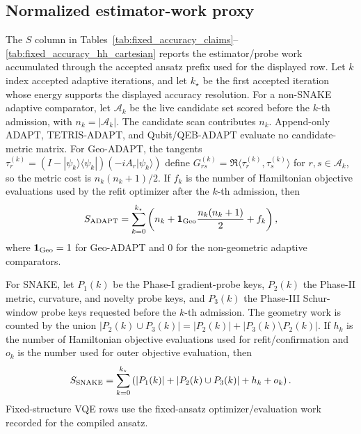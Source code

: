 \documentclass[
  reprint,
  amsmath,
  amssymb,
  aps,
  pra,
  nofootinbib,
  superscriptaddress,
  floatfix
]{revtex4-2}
\begin{document}
\subsection{Normalized estimator-work proxy}

The \(S\) column in Tables~\ref{tab:fixed_accuracy_claims}--\ref{tab:fixed_accuracy_hh_cartesian} reports the estimator/probe work accumulated through the accepted ansatz prefix used for the displayed row.  Let \(k\) index accepted adaptive iterations, and let \(k_\star\) be the first accepted iteration whose energy supports the displayed accuracy resolution.  For a non-SNAKE adaptive comparator, let \(\mathcal A_k\) be the live candidate set scored before the \(k\)-th admission, with \(n_k=|\mathcal A_k|\).  The candidate scan contributes \(n_k\).  Append-only ADAPT, TETRIS-ADAPT, and Qubit/QEB-ADAPT evaluate no candidate-metric matrix.  For Geo-ADAPT, the tangents \(\tau_r^{(k)}=(I-|\psi_k\rangle\langle\psi_k|)(-iA_r|\psi_k\rangle)\) define \(G_{rs}^{(k)}=\Re\langle\tau_r^{(k)},\tau_s^{(k)}\rangle\) for \(r,s\in\mathcal A_k\), so the metric cost is \(n_k(n_k+1)/2\).  If \(f_k\) is the number of Hamiltonian objective evaluations used by the refit optimizer after the \(k\)-th admission, then
\begin{equation}
S_{\rm ADAPT}
=
\sum_{k=0}^{k_\star}
\left(
n_k+\mathbf 1_{\rm Geo}\frac{n_k(n_k+1)}{2}+f_k
\right),
\label{eq:appendix_s_adapt}
\end{equation}
where \(\mathbf 1_{\rm Geo}=1\) for Geo-ADAPT and \(0\) for the non-geometric adaptive comparators.

For SNAKE, let \(P_1(k)\) be the Phase-I gradient-probe keys, \(P_2(k)\) the Phase-II metric, curvature, and novelty probe keys, and \(P_3(k)\) the Phase-III Schur-window probe keys requested before the \(k\)-th admission.  The geometry work is counted by the union \(|P_2(k)\cup P_3(k)|=|P_2(k)|+|P_3(k)\setminus P_2(k)|\).  If \(h_k\) is the number of Hamiltonian objective evaluations used for refit/confirmation and \(o_k\) is the number used for outer objective evaluation, then
\begin{equation}
S_{\rm SNAKE}
=
\sum_{k=0}^{k_\star}
\left(
|P_1(k)|+|P_2(k)\cup P_3(k)|+h_k+o_k
\right).
\label{eq:appendix_s_snake}
\end{equation}
Fixed-structure VQE rows use the fixed-ansatz optimizer/evaluation work recorded for the compiled ansatz.
\end{document}
